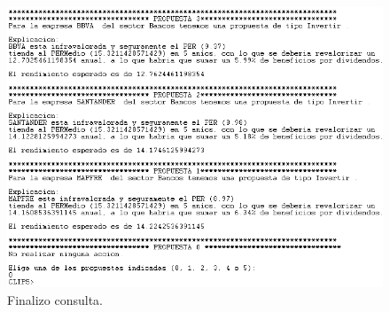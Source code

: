 \documentclass[12pt]{article}
\begin{document}
\begin{figure}[H]
	\includegraphics[width=18cm]{7.png} 
	\caption{Finalizo consulta.}
	\label{siete} 
\end{figure}
\end{document}
